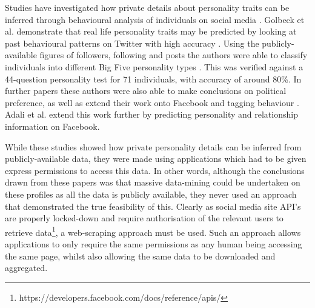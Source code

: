 Studies have investigated how private details about personality traits can be inferred through behavioural analysis of individuals on social media \cite{adali2012predicting,adali2012actions,bachrach2012personality,golbeck2011predicting,golbeck2011computing,golbeck2011,golbeck2011experimental}. Golbeck et al. demonstrate that real life personality traits may be predicted by looking at past behavioural patterns on Twitter with high accuracy \cite{golbeck2011predicting}. Using the publicly-available figures of followers, following and posts the authors were able to classify individuals into different Big Five personality types \cite{de2000big}. This was verified against a 44-question personality test for 71 individuals, with accuracy of around 80\%. In further papers these authors were also able to make conclusions on political preference, as well as extend their work onto Facebook and tagging behaviour \cite{golbeck2011computing,golbeck2011,golbeck2011experimental}. Adali et al. \cite{adali2012predicting,adali2012actions} extend this work further by predicting personality and relationship information on Facebook.

While these studies showed how private personality details can be inferred from publicly-available data, they were made using applications which had to be given express permissions to access this data. In other words, although the conclusions drawn from these papers was that massive data-mining could be undertaken on these profiles as all the data is publicly available, they never used an approach that demonstrated the true feasibility of this. Clearly as social media site API's are properly locked-down and require authorisation of the relevant users to retrieve data\footnote{https://developers.facebook.com/docs/reference/apis/}, a web-scraping approach must be used. Such an approach allows applications to only require the same permissions as any human being accessing the same page, whilst also allowing the same data to be downloaded and aggregated.

